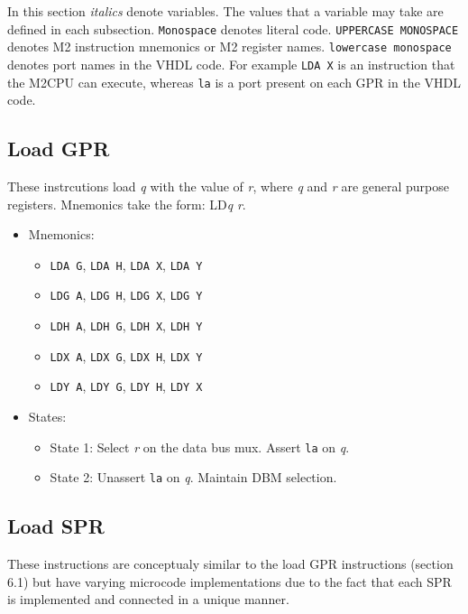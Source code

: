 \documentclass[a4paper,12pt]{article}
\newcommand{\mt}{M2CPU}
\newcommand{\qq}{\textit{q}}
\newcommand\rr{\textit{r}}
\begin{document}
In this section \textit{italics} denote variables. The values that a variable 
may take are defined in each subsection. \texttt{Monospace} denotes literal 
code. \texttt{UPPERCASE MONOSPACE} denotes M2 instruction mnemonics or M2 
register names. \texttt{lowercase monospace} denotes port names in the VHDL
code. For example \texttt{LDA X} is an instruction that the \mt{} can execute,
whereas \texttt{la} is a port present on each GPR in the VHDL code.
\par

\subsection{Load GPR}
These instrcutions load \qq{} with the value of \rr{}, where \qq{} and \rr{}
are general purpose registers. Mnemonics take the form: LD\qq{} \rr{}.
\par

\begin{itemize}
\item Mnemonics:
\begin{itemize}
	\item \texttt{LDA G}, \texttt{LDA H}, \texttt{LDA X}, \texttt{LDA Y}
	\item \texttt{LDG A}, \texttt{LDG H}, \texttt{LDG X}, \texttt{LDG Y}
	\item \texttt{LDH A}, \texttt{LDH G}, \texttt{LDH X}, \texttt{LDH Y}
	\item \texttt{LDX A}, \texttt{LDX G}, \texttt{LDX H}, \texttt{LDX Y}
	\item \texttt{LDY A}, \texttt{LDY G}, \texttt{LDY H}, \texttt{LDY X}
\end{itemize}
\item States:
\begin{itemize}
	\item State 1: Select \rr{} on the data bus mux. Assert \texttt{la} on
	\qq{}.
	\item State 2: Unassert \texttt{la} on \qq{}. Maintain DBM selection.
\end{itemize}
\end{itemize}

\subsection{Load SPR}
These instructions are conceptualy similar to the load GPR instructions
(section 6.1) but have varying microcode implementations due to the fact that
each SPR is implemented and connected in a unique manner.
\par
\end{document}
